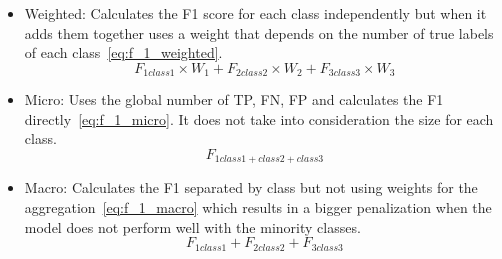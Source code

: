 \begin{itemize}
 \item Weighted: Calculates the F1 score for each class independently but when it adds them together uses a weight that depends on the number of true labels of each class~\eqref{eq:f_1_weighted}.%
\begin{equation}\label{eq:f_1_weighted}
F_{1 class1}\times W_1 + F_{2 class2}\times W_2 + F_{3 class3}\times W_3
\end{equation}%

 \item Micro: Uses the global number of TP, FN, FP and calculates the F1 directly~\eqref{eq:f_1_micro}. It does not take into consideration the size for each class.%
 \begin{equation}\label{eq:f_1_micro}
F_{1 class1+class2+class3}
\end{equation}%
 \item Macro: Calculates the F1 separated by class but not using weights for the aggregation~\eqref{eq:f_1_macro}  which results in a bigger penalization when the model does not perform well with the minority classes.%
\begin{equation}\label{eq:f_1_macro}
F_{1 class1} + F_{2 class2} + F_{3 class3}
\end{equation}%
\end{itemize}

